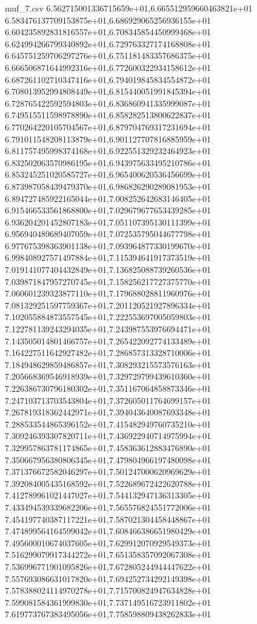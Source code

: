 \begin{filecontents*}{muf_7.csv}
6.562715001336715659e+01,6.665512959660463821e+01
6.583476137709153875e+01,6.686929065256936155e+01
6.604235892831816557e+01,6.708345854450999468e+01
6.624994266799340892e+01,6.729763327174168808e+01
6.645751259706297276e+01,6.751181483357686375e+01
6.666506871644992316e+01,6.772600322934158612e+01
6.687261102710347416e+01,6.794019845834554872e+01
6.708013952994808449e+01,6.815440051991845394e+01
6.728765422592594803e+01,6.836860941335999087e+01
6.749515511598978890e+01,6.858282513800622837e+01
6.770264220105704567e+01,6.879704769317231694e+01
6.791011548208113879e+01,6.901127707816885959e+01
6.811757495998374168e+01,6.922551329232464923e+01
6.832502063570986195e+01,6.943975633495210786e+01
6.853245251020585727e+01,6.965400620536456699e+01
6.873987058439479370e+01,6.986826290289081953e+01
6.894727485922165044e+01,7.008252642683146405e+01
6.915466533561868800e+01,7.029679677653439285e+01
6.936204201452807183e+01,7.051107395130111399e+01
6.956940489689407059e+01,7.072535795044677798e+01
6.977675398363901138e+01,7.093964877330199670e+01
6.998408927571497884e+01,7.115394641917373519e+01
7.019141077404432849e+01,7.136825088739260536e+01
7.039871847957270745e+01,7.158256217727375770e+01
7.060601239323877110e+01,7.179688028811960976e+01
7.081329251597759367e+01,7.201120521927896334e+01
7.102055884873557545e+01,7.222553697005059803e+01
7.122781139243294035e+01,7.243987553976694471e+01
7.143505014801466757e+01,7.265422092774133489e+01
7.164227511642927482e+01,7.286857313328710006e+01
7.184948629859486857e+01,7.308293215573576163e+01
7.205668369546918939e+01,7.329729799439610360e+01
7.226386730796180302e+01,7.351167064858873346e+01
7.247103713703543804e+01,7.372605011764699157e+01
7.267819318362442971e+01,7.394043640087693348e+01
7.288533544865396152e+01,7.415482949760735210e+01
7.309246393307820711e+01,7.436922940714975994e+01
7.329957863781174865e+01,7.458363612883476890e+01
7.350667956380806345e+01,7.479804966197480098e+01
7.371376672582046297e+01,7.501247000620969629e+01
7.392084005435168592e+01,7.522689672422620788e+01
7.412789961021447027e+01,7.544132947136313305e+01
7.433494539339682206e+01,7.565576824551772006e+01
7.454197740387117221e+01,7.587021304458448867e+01
7.474899564164599042e+01,7.608466386651980429e+01
7.495600010674037605e+01,7.629912070929549373e+01
7.516299079917344272e+01,7.651358357092067308e+01
7.536996771901095826e+01,7.672805244944447622e+01
7.557693086631017820e+01,7.694252734292149398e+01
7.578388024114970278e+01,7.715700824947634828e+01
7.599081584361999830e+01,7.737149516723911802e+01
7.619773767383495056e+01,7.758598809438262833e+01

\end{filecontents*}
